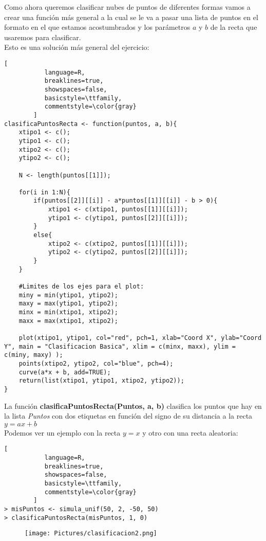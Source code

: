 \documentclass[11pt,fleqn]{book} %
\begin{document}
Como ahora queremos clasificar nubes de puntos de diferentes formas vamos a crear una función más general a la cual se le va a pasar una lista de puntos en el formato en el que estamos acostumbrados y los parámetros $a$ y $b$ de la recta que usaremos para clasificar.\\
Esto es una solución más general del ejercicio:

\begin{lstlisting}[
           language=R,
           breaklines=true,
           showspaces=false,
           basicstyle=\ttfamily,
           commentstyle=\color{gray}
        ]
clasificaPuntosRecta <- function(puntos, a, b){
    xtipo1 <- c();
    ytipo1 <- c();
    xtipo2 <- c();
    ytipo2 <- c();
    
    N <- length(puntos[[1]]);
    
    for(i in 1:N){
        if(puntos[[2]][[i]] - a*puntos[[1]][[i]] - b > 0){
            xtipo1 <- c(xtipo1, puntos[[1]][[i]]);
            ytipo1 <- c(ytipo1, puntos[[2]][[i]]);
        }
        else{
            xtipo2 <- c(xtipo2, puntos[[1]][[i]]);
            ytipo2 <- c(ytipo2, puntos[[2]][[i]]);
        }
    }
    
    #Limites de los ejes para el plot:
    miny = min(ytipo1, ytipo2);
    maxy = max(ytipo1, ytipo2);
    minx = min(xtipo1, xtipo2);
    maxx = max(xtipo1, xtipo2);
    
    plot(xtipo1, ytipo1, col="red", pch=1, xlab="Coord X", ylab="Coord Y", main = "Clasificacion Basica", xlim = c(minx, maxx), ylim = c(miny, maxy) );
    points(xtipo2, ytipo2, col="blue", pch=4);
    curve(a*x + b, add=TRUE);
    return(list(xtipo1, ytipo1, xtipo2, ytipo2));
}
\end{lstlisting}

La función \textbf{clasificaPuntosRecta(Puntos, a, b)} clasifica los puntos que hay en la lista \textit{Puntos} con dos etiquetas en función del signo de su distancia a la recta $y = ax + b$\\
Podemos ver un ejemplo con la recta $y=x$ y otro con una recta aleatoria:

\begin{lstlisting}[
           language=R,
           breaklines=true,
           showspaces=false,
           basicstyle=\ttfamily,
           commentstyle=\color{gray}
        ]
> misPuntos <- simula_unif(50, 2, -50, 50)
> clasificaPuntosRecta(misPuntos, 1, 0)
\end{lstlisting}

\begin{figure}[h]
\texttt{[image: Pictures/clasificacion2.png]}
\end{figure}
\end{document}
